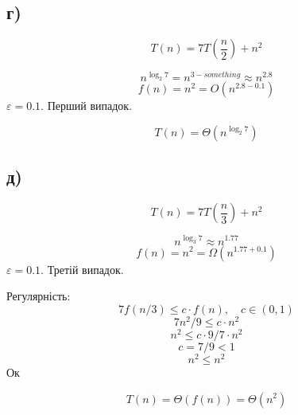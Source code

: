 \documentclass[11pt, a4paper]{article} %
\begin{document}
\subsection*{г)}
\begin{mdframed}
    $$T(n) = 7T(\frac{n}{2}) + n^2$$
\end{mdframed}

$$n^{\log_2 7} = n^{3-something} \approx n^{2.8}$$
$$f(n) = n^2 = O(n^{2.8 - 0.1})$$
$\varepsilon = 0.1$. Перший випадок.

\begin{mdframed}[style=ans]
    $$T(n) = \Theta(n^{\log_2 7})$$
\end{mdframed}

\subsection*{д)}
\begin{mdframed}
    $$T(n) = 7T(\frac{n}{3}) + n^2$$
\end{mdframed}

$$n^{\log_3 7} \approx n^{1.77}$$
$$f(n) = n^2 = \Omega(n^{1.77+0.1})$$
$\varepsilon = 0.1$. Третій випадок.

Регулярність:
$$7f(n/3) \le c\cdot f(n), \quad c\in(0,1)$$
$$7n^2/9 \le c \cdot n^2$$
$$n^2 \le c \cdot 9/7 \cdot n^2$$
$$c = 7/9 < 1$$
$$n^2 \le n^2$$
Ок 

\begin{mdframed}[style=ans]
    $$T(n) = \Theta(f(n)) = \Theta(n^2)$$
\end{mdframed}
\end{document}
